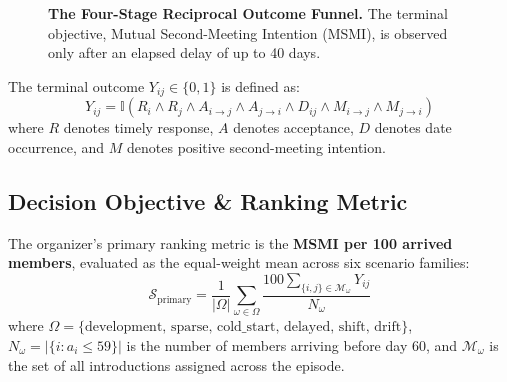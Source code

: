 \documentclass[10pt,twocolumn,letterpaper]{article}
\begin{document}
\begin{figure}[h]
\centering
{}
\caption{\textbf{The Four-Stage Reciprocal Outcome Funnel.} The terminal objective, Mutual Second-Meeting Intention (MSMI), is observed only after an elapsed delay of up to 40 days.}
\label{fig:funnel}
\end{figure}

The terminal outcome $Y_{ij} \in \{0, 1\}$ is defined as:
\begin{equation}
\label{eq:terminal_y}
Y_{ij} = \mathbb{I}\left(R_i \wedge R_j \wedge A_{i \to j} \wedge A_{j \to i} \wedge D_{ij} \wedge M_{i \to j} \wedge M_{j \to i}\right)
\end{equation}
where $R$ denotes timely response, $A$ denotes acceptance, $D$ denotes date occurrence, and $M$ denotes positive second-meeting intention.

\subsection{Decision Objective \& Ranking Metric}
The organizer's primary ranking metric is the \textbf{MSMI per 100 arrived members}, evaluated as the equal-weight mean across six scenario families:
\begin{equation}
\label{eq:objective}
\mathcal{S}_{\text{primary}} = \frac{1}{|\Omega|} \sum_{\omega \in \Omega} \frac{100 \sum_{\{i, j\} \in \mathcal{M}_\omega} Y_{ij}}{N_\omega}
\end{equation}
where $\Omega = \{\text{development, sparse, cold\_start, delayed, shift, drift}\}$, $N_\omega = |\{i : a_i \le 59\}|$ is the number of members arriving before day 60, and $\mathcal{M}_\omega$ is the set of all introductions assigned across the episode.
\end{document}
